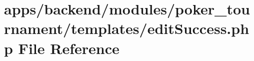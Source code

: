 \hypertarget{backend_2modules_2poker__tournament_2templates_2edit_success_8php}{\section{apps/backend/modules/poker\-\_\-tournament/templates/edit\-Success.php File Reference}
\label{backend_2modules_2poker__tournament_2templates_2edit_success_8php}
}
